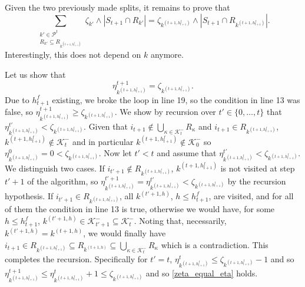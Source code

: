 \documentclass[
  11pt,
  a4paper,
]{article}
\theoremstyle{plain}
\theoremstyle{plain}
\theoremstyle{definition}
\theoremstyle{plain}
\theoremstyle{definition}
\theoremstyle{remark}
\begin{document}
Given the two previously made splits, it remains to prove that
\begin{equation*}
\sum_{\substack{k'\in\mathcal{P}^{t}\\R_{k'}\subseteq  R_{  k^{(t+1,h^f_{t+1})}} }} \zeta_{k'}\wedge |S_{t+1}\cap R_{k'}| =  \zeta_{ k^{(t+1,h^f_{t+1})}}\wedge |S_{t+1}\cap R_{ k^{(t+1,h^f_{t+1})}}|.
\end{equation*} Interestingly, this does not depend on \(k\) anymore.

Let us show that \begin{equation}
\eta^{t+1}_{k^{(t+1,h^f_{t+1})} }= \zeta_{ k^{(t+1,h^f_{t+1})}}.
\label{zeta_equal_eta}
\end{equation} Due to \(h^f_{t+1}\) existing, we broke the loop in line
19, so the condition in line 13 was false, so
\(\eta^{t+1}_{k^{(t+1,h^f_{t+1})} }\geq \zeta_{ k^{(t+1,h^f_{t+1})}}\).
We show by recursion over \(t'\in\{0,\dotsc,t\}\) that
\(\eta^{t'}_{k^{(t+1,h^f_{t+1})} }< \zeta_{ k^{(t+1,h^f_{t+1})}}\).
Given that
\(i_{t+1}\not\in\bigcup_{\kappa\in\mathcal{K}^-_{t}}R_{\kappa}\) and
\(i_{t+1}\in R_{k^{(t+1,h^f_{t+1})}}\),
\(k^{(t+1,h^f_{t+1})} \not\in \mathcal{K}^-_{t}\) and in particular
\(k^{(t+1,h^f_{t+1})} \not\in \mathcal{K}^-_{0}\) so
\(\eta^{0}_{k^{(t+1,h^f_{t+1})} }=0< \zeta_{ k^{(t+1,h^f_{t+1})}}\). Now
let \(t'<t\) and assume that
\(\eta^{t'}_{k^{(t+1,h^f_{t+1})} }< \zeta_{ k^{(t+1,h^f_{t+1})}}\). We
distinguish two cases. If \(i_{t'+1}\not\in R_{k^{(t+1,h^f_{t+1})}}\),
\(k^{(t+1,h^f_{t+1})}\) is not visited at step \(t'+1\) of the
algorithm, so
\(\eta^{t'+1}_{k^{(t+1,h^f_{t+1})} }=\eta^{t'}_{k^{(t+1,h^f_{t+1})} }< \zeta_{ k^{(t+1,h^f_{t+1})}}\)
by the recursion hypothesis. If \(i_{t'+1}\in R_{k^{(t+1,h^f_{t+1})}}\),
all \(k^{(t'+1,h)}\), \(h\leq h^f_{t+1}\), are visited, and for all of
them the condition in line 13 is true, otherwise we would have, for some
\(h\leq h^f_{t+1}\),
\(k^{(t'+1,h)}\in\mathcal{K}^-_{t'+1}\subseteq\mathcal{K}^-_{t}\).
Noting that, necessarily, \(k^{(t'+1,h)}=k^{(t+1,h)}\), we would finally
have
\(i_{t+1}\in R_{k^{(t+1,h^f_{t+1})}}\subseteq R_{k^{(t+1,h)}}\subseteq \bigcup_{\kappa\in\mathcal{K}^-_{t}}R_{\kappa}\)
which is a contradiction. This completes the recursion. Specifically for
\(t'=t\),
\(\eta^{t}_{k^{(t+1,h^f_{t+1})} }\leq \zeta_{ k^{(t+1,h^f_{t+1})}}-1\)
and so
\(\eta^{t+1}_{k^{(t+1,h^f_{t+1})} }\leq\eta^{t}_{k^{(t+1,h^f_{t+1})} }+1\leq \zeta_{ k^{(t+1,h^f_{t+1})}}\)
and so \eqref{zeta_equal_eta} holds.
\end{document}
